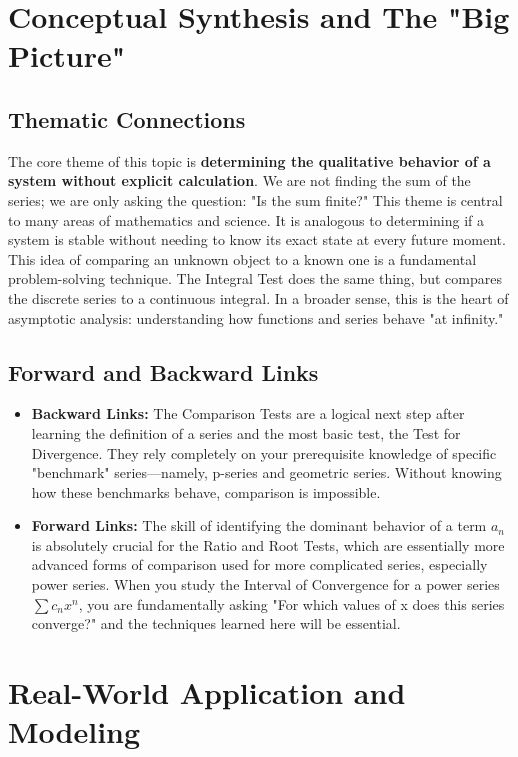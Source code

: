 \documentclass{article}
\begin{document}
\section{Conceptual Synthesis and The "Big Picture"}

\subsection{Thematic Connections}
The core theme of this topic is \textbf{determining the qualitative behavior of a system without explicit calculation}. We are not finding the sum of the series; we are only asking the question: "Is the sum finite?" This theme is central to many areas of mathematics and science. It is analogous to determining if a system is stable without needing to know its exact state at every future moment. This idea of comparing an unknown object to a known one is a fundamental problem-solving technique. The Integral Test does the same thing, but compares the discrete series to a continuous integral. In a broader sense, this is the heart of asymptotic analysis: understanding how functions and series behave "at infinity."

\subsection{Forward and Backward Links}
\begin{itemize}
    \item \textbf{Backward Links:} The Comparison Tests are a logical next step after learning the definition of a series and the most basic test, the Test for Divergence. They rely completely on your prerequisite knowledge of specific "benchmark" series—namely, p-series and geometric series. Without knowing how these benchmarks behave, comparison is impossible.
    \item \textbf{Forward Links:} The skill of identifying the dominant behavior of a term \(a_n\) is absolutely crucial for the Ratio and Root Tests, which are essentially more advanced forms of comparison used for more complicated series, especially power series. When you study the Interval of Convergence for a power series \(\sum c_n x^n\), you are fundamentally asking "For which values of x does this series converge?" and the techniques learned here will be essential.
\end{itemize}

\section{Real-World Application and Modeling}
\end{document}
